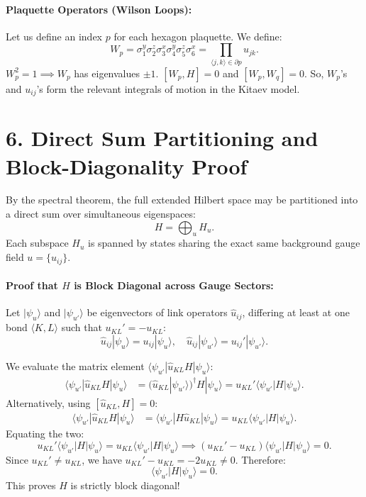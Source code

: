 \documentclass[11pt,a4paper]{article}
\begin{document}
\paragraph{Plaquette Operators (Wilson Loops):}
Let us define an index $p$ for each hexagon plaquette. We define:
\begin{equation}
    W_p = \sigma_1^y \sigma_2^z \sigma_3^x \sigma_4^y \sigma_5^z \sigma_6^x = \prod_{\langle j,k \rangle \in \partial p} u_{jk}.
\end{equation}
$W_p^2 = 1 \implies W_p$ has eigenvalues $\pm 1$.
$[W_p, H] = 0$ and $[W_p, W_q] = 0$. So, $W_p$'s and $u_{ij}$'s form the relevant integrals of motion in the Kitaev model.


\section*{6. Direct Sum Partitioning and Block-Diagonality Proof}

By the spectral theorem, the full extended Hilbert space may be partitioned into a direct sum over simultaneous eigenspaces:
\begin{equation}
    H = \bigoplus_{u} H_u.
\end{equation}
Each subspace $H_u$ is spanned by states sharing the exact same background gauge field $u = \{u_{ij}\}$.

\paragraph{Proof that $H$ is Block Diagonal across Gauge Sectors:}
Let $|\psi_u\rangle$ and $|\psi_{u'}\rangle$ be eigenvectors of link operators $\hat{u}_{ij}$, differing at least at one bond $\langle K,L \rangle$ such that $u_{KL}' = -u_{KL}$:
\begin{equation}
    \hat{u}_{ij} |\psi_u\rangle = u_{ij} |\psi_u\rangle, \quad \hat{u}_{ij} |\psi_{u'}\rangle = u_{ij}' |\psi_{u'}\rangle.
\end{equation}

We evaluate the matrix element $\langle \psi_{u'} | \hat{u}_{KL} H | \psi_u \rangle$:
\begin{align}
    \langle \psi_{u'} | \hat{u}_{KL} H | \psi_u \rangle &= (\hat{u}_{KL} |\psi_{u'}\rangle)^\dagger H |\psi_u\rangle = u_{KL}' \langle \psi_{u'} | H | \psi_u \rangle.
\end{align}
Alternatively, using $[\hat{u}_{KL}, H] = 0$:
\begin{align}
    \langle \psi_{u'} | \hat{u}_{KL} H | \psi_u \rangle &= \langle \psi_{u'} | H \hat{u}_{KL} | \psi_u \rangle = u_{KL} \langle \psi_{u'} | H | \psi_u \rangle.
\end{align}
Equating the two:
\begin{equation}
    u_{KL}' \langle \psi_{u'} | H | \psi_u \rangle = u_{KL} \langle \psi_{u'} | H | \psi_u \rangle \implies (u_{KL}' - u_{KL}) \langle \psi_{u'} | H | \psi_u \rangle = 0.
\end{equation}
Since $u_{KL}' \neq u_{KL}$, we have $u_{KL}' - u_{KL} = -2u_{KL} \neq 0$. Therefore:
\begin{equation}
    \langle \psi_{u'} | H | \psi_u \rangle = 0.
\end{equation}
This proves $H$ is strictly block diagonal!
\end{document}
